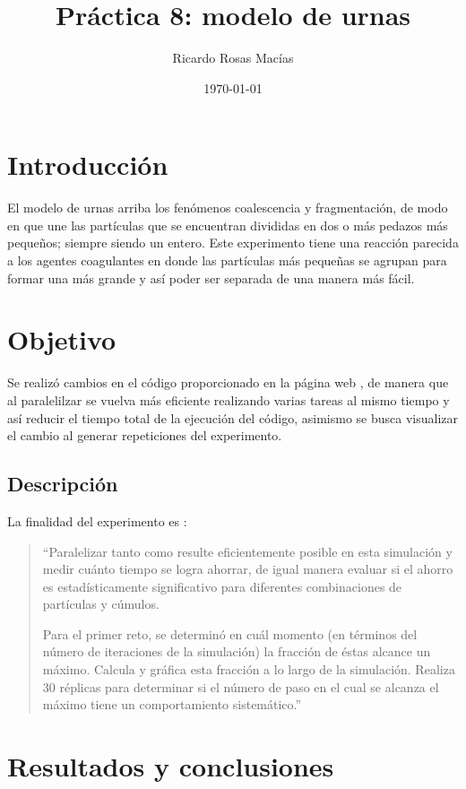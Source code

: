 \documentclass[12pt, letterpaper] {article}
\author{Ricardo Rosas Macías}
\title{Práctica 8: modelo de urnas}
\date{\today}
\begin{document}
\maketitle


\section{Introducción}
El modelo de urnas arriba los fenómenos coalescencia y fragmentación, de modo en que une las partículas que se encuentran divididas en dos o más pedazos más pequeños; siempre siendo un entero. Este experimento tiene una reacción parecida a los agentes coagulantes en donde las partículas más pequeñas se agrupan para formar una más grande y así poder ser separada de una manera más fácil. 

 \section{Objetivo}
Se realizó cambios en el c\'odigo proporcionado en la p\'agina web \cite{elisawebUrna}, de manera que al paralelilzar se vuelva más eficiente realizando varias tareas al mismo tiempo y así reducir el tiempo total de la ejecución del código, asimismo se busca visualizar el cambio al generar repeticiones del experimento.

 
 \subsection{Descripción}
 
La finalidad del experimento es \cite{elisawebUrna}:
\begin{quotation}
 ``Paralelizar tanto como resulte eficientemente posible en esta simulación y medir cuánto tiempo se logra ahorrar, de igual manera evaluar si el ahorro es estadísticamente significativo para diferentes combinaciones de partículas y cúmulos.

Para el primer reto, se determinó en cuál momento (en términos del número de iteraciones de la simulación) la fracción de éstas alcance un máximo. Calcula y gráfica esta fracción a lo largo de la simulación. Realiza 30 réplicas para determinar si el número de paso en el cual se alcanza el máximo tiene un comportamiento sistemático.''
\end{quotation}

\section{Resultados y conclusiones}
\end{document}
